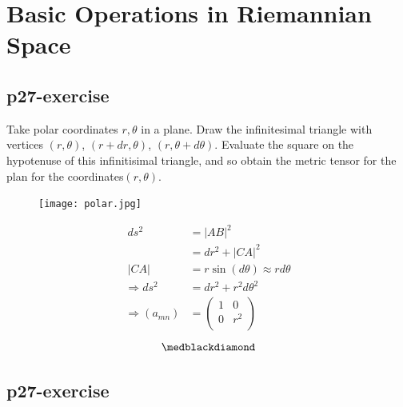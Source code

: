\chapter{Basic Operations in Riemannian Space}
\pagebreak[4]

\section{p27-exercise}

\begin{tcolorbox}
Take polar coordinates $r, \theta$ in a plane. Draw the infinitesimal triangle with vertices $(r,\theta)$, $(r+dr,\theta)$, $(r,\theta + d\theta)$. Evaluate the square on the hypotenuse of this infinitisimal triangle, and so obtain the metric tensor for the plan for the coordinates$(r, \theta)$.\end{tcolorbox}
\begin{figure}[htp] 
    \centering
\texttt{[image: polar.jpg]}
\end{figure}
\begin{align} 
\ ds^2 &= |AB|^2\\
\ &= dr^2 +|CA|^2\\
\ |CA| &= r\sin(d\theta)\approx rd\theta\\
\Rightarrow ds^2 &= dr^2 + r^2d\theta^2\\
\Rightarrow (a_{mn}) &= \begin{pmatrix}
 1& 0 \\
0 & r^2 \\
\end{pmatrix}
\end{align}
$$\medblackdiamond$$
\pagebreak[4]

\section{p27-exercise}

